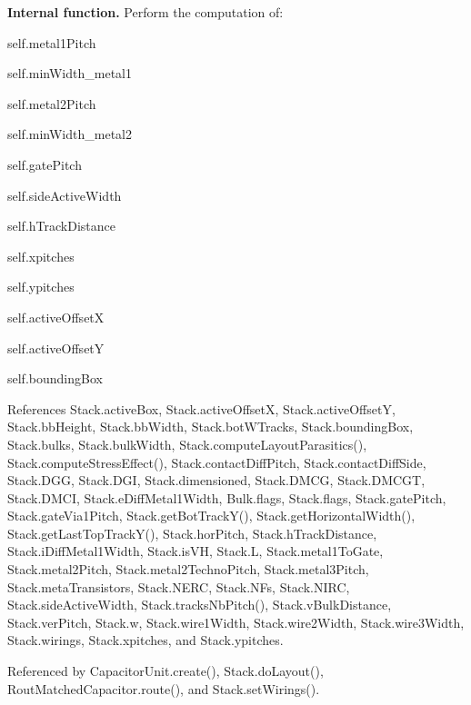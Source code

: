 {\bfseries Internal function.} Perform the computation of\+:
\begin{DoxyItemize}
\item {\ttfamily self.\+metal1\+Pitch} 
\item {\ttfamily self.\+min\+Width\+\_\+metal1} 
\item {\ttfamily self.\+metal2\+Pitch} 
\item {\ttfamily self.\+min\+Width\+\_\+metal2} 
\item {\ttfamily self.\+gate\+Pitch} 
\item {\ttfamily self.\+side\+Active\+Width} 
\item {\ttfamily self.\+h\+Track\+Distance} 
\item {\ttfamily self.\+xpitches} 
\item {\ttfamily self.\+ypitches} 
\item {\ttfamily self.\+active\+OffsetX} 
\item {\ttfamily self.\+active\+OffsetY} 
\item {\ttfamily self.\+bounding\+Box} 
\end{DoxyItemize}

References Stack.\+active\+Box, Stack.\+active\+OffsetX, Stack.\+active\+OffsetY, Stack.\+bb\+Height, Stack.\+bb\+Width, Stack.\+bot\+W\+Tracks, Stack.\+bounding\+Box, Stack.\+bulks, Stack.\+bulk\+Width, Stack.\+compute\+Layout\+Parasitics(), Stack.\+compute\+Stress\+Effect(), Stack.\+contact\+Diff\+Pitch, Stack.\+contact\+Diff\+Side, Stack.\+D\+GG, Stack.\+D\+GI, Stack.\+dimensioned, Stack.\+D\+M\+CG, Stack.\+D\+M\+C\+GT, Stack.\+D\+M\+CI, Stack.\+e\+Diff\+Metal1\+Width, Bulk.\+flags, Stack.\+flags, Stack.\+gate\+Pitch, Stack.\+gate\+Via1\+Pitch, Stack.\+get\+Bot\+Track\+Y(), Stack.\+get\+Horizontal\+Width(), Stack.\+get\+Last\+Top\+Track\+Y(), Stack.\+hor\+Pitch, Stack.\+h\+Track\+Distance, Stack.\+i\+Diff\+Metal1\+Width, Stack.\+is\+VH, Stack.\+L, Stack.\+metal1\+To\+Gate, Stack.\+metal2\+Pitch, Stack.\+metal2\+Techno\+Pitch, Stack.\+metal3\+Pitch, Stack.\+meta\+Transistors, Stack.\+N\+E\+RC, Stack.\+N\+Fs, Stack.\+N\+I\+RC, Stack.\+side\+Active\+Width, Stack.\+tracks\+Nb\+Pitch(), Stack.\+v\+Bulk\+Distance, Stack.\+ver\+Pitch, Stack.\+w, Stack.\+wire1\+Width, Stack.\+wire2\+Width, Stack.\+wire3\+Width, Stack.\+wirings, Stack.\+xpitches, and Stack.\+ypitches.



Referenced by Capacitor\+Unit.\+create(), Stack.\+do\+Layout(), Rout\+Matched\+Capacitor.\+route(), and Stack.\+set\+Wirings().

